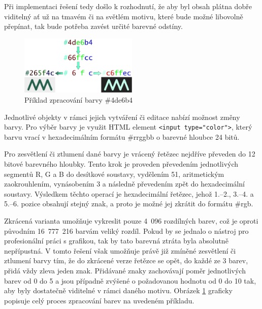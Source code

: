 Při implementaci řešení tedy došlo k rozhodnutí, že aby byl obsah plátna dobře viditelný ať už na tmavém či na světlém motivu, které bude možné libovolně přepínat, tak bude potřeba zavést určité barevné odstíny.

\begin{figure}[h!]
	\centering
	\includegraphics[width=0.5\textwidth]{Figures/colorMode.pdf}
	\caption{Příklad zpracování barvy \#4de6b4}
	\label{fig:colorMode}
\end{figure}

\begin{sloppypar*}
Jednotlivé objekty v rámci jejich vytváření či editace nabízí možnost změny barvy.
Pro výběr barvy je využit HTML element \texttt{<input type="color">}, který barvu vrací v hexadecimálním formátu \#rrggbb o barevné hloubce 24 bitů.
\end{sloppypar*}
Pro zesvětlení či ztlumení dané barvy je vrácený řetězec nejdříve převeden do 12 bitové barevného hloubky.
Tento krok je proveden převedením jednotlivých segmentů R, G a B do desítkové soustavy, vydělením 51, aritmetickým zaokrouhlením, vynásobením 3 a následně převedením zpět do hexadecimální soustavy.
Výsledkem těchto operací je hexadecimální řetězec, jehož 1.--2., 3.--4. a 5.--6. pozice obsahují stejný znak, a proto je možné jej zkrátit do formátu \#rgb.

Zkrácená varianta umožňuje vykreslit pouze 4~096 rozdílných barev, což je oproti původním 16~777~216 barvám veliký rozdíl.
Pokud by se jednalo o nástroj pro profesionální práci s grafikou, tak by tato barevná ztráta byla absolutně nepřípustná.
V tomto řešení však umožňuje právě již zmíněné zesvětlení či ztlumení barvy tím, že do zkrácené verze řetězce se opět, do každé ze 3 barev, přidá vždy zleva jeden znak.
Přidávané znaky zachovávají poměr jednotlivých barev od 0 do 5 a jsou případně zvýšené o požadovanou hodnotu od 0 do 10 tak, aby byly dostatečně viditelné v rámci daného motivu.
Obrázek \ref{fig:colorMode} graficky popisuje celý proces zpracování barev na uvedeném příkladu.

